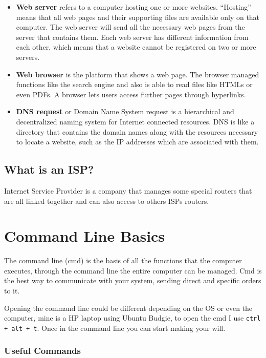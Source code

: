 \documentclass{article}
\begin{document}
\begin{itemize}
		\item \textbf{Web server} refers to a computer hosting one or more websites. ``Hosting'' means that all web pages and their supporting files are available only on that computer. The web server will send all the necessary web pages from the server that contains them. Each web server has different information from each other, which means that a website cannot be registered on two or more servers.
		
		\item \textbf{Web browser} is the platform that shows a web page. The browser managed functions like the search engine and also is able to read files like HTMLs or even PDFs. A browser lets users access further pages through hyperlinks.
		
		\item \textbf{DNS request} or Domain Name System request is a hierarchical and decentralized naming system for Internet connected resources. DNS is like a directory that contains the domain names along with the resources necessary to locate a website, such as the IP addresses which are associated with them.
	\end{itemize}
    
    \subsection{What is an ISP?}
    
    Internet Service Provider is a company that manages some special routers that are all linked together and can also access to others ISPs routers.
    
    \section{Command Line Basics}
    
    The command line (cmd) is the basis of all the functions that the computer executes, through the command line the entire computer can be managed. Cmd is the best way to communicate with your system, sending direct and specific orders to it.\par
    Opening the command line could be different depending on the OS or even the computer, mine is a HP laptop using Ubuntu Budgie, to open the cmd I use {\tt ctrl + alt + t}. Once in the command line you can start making your will.
    
    \subsubsection{Useful Commands}
    
\end{document}
